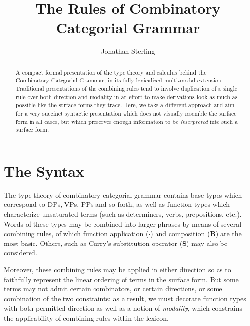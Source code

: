 \documentclass{amsart}
\title{The Rules of Combinatory Categorial Grammar}
\author{Jonathan Sterling}
\begin{document}
\begin{abstract}
  A compact formal presentation of the type theory and calculus behind
  the Combinatory Categorial Grammar, in its fully lexicalized
  multi-modal extension. Traditional presentations of the
  combining rules tend to involve duplication of a single rule over both
  direction and modality in an effort to make derivations look as much
  as possible like the surface forms they trace. Here, we take a
  different approach and aim for a very succinct syntactic presentation
  which does not visually resemble the surface form in all cases, but
  which preserves enough information to be \emph{interpreted} into such
  a surface form.
\end{abstract}

\maketitle

\def\ty#1{\ensuremath{\mathsf{#1}}}
\def\con#1{\ensuremath{\mathsf{#1}}}
\def\ident#1{\ensuremath{\operatorname{\mathsf{#1}}}}
\def\induction#1{\mathkw{induction}\ #1}
\def\decide#1{\mathkw{decide}\ #1}

\section{The Syntax}

The type theory of combinatory categorial grammar contains base types
which correspond to DPs, VPs, PPs and so forth, as well as function
types which characterize unsaturated terms (such as determiners, verbs,
prepositions, etc.). Words of these types may be combined into larger
phrases by means of several combining rules, of which function
application ($\cdot$) and composition ($\mathbf{B}$) are the most basic.
Others, such as Curry's substitution operator ($\mathbf{S}$) may also be
considered.

Moreover, these combining rules may be applied in either direction so as
to faithfully represent the linear ordering of terms in the surface
form. But some terms may not admit certain combinators, or certain
directions, or some combination of the two constraints: as a result, we
must decorate function types with both permitted direction as well as a
notion of \emph{modality}, which constrains the applicability of
combining rules within the lexicon.
\end{document}
